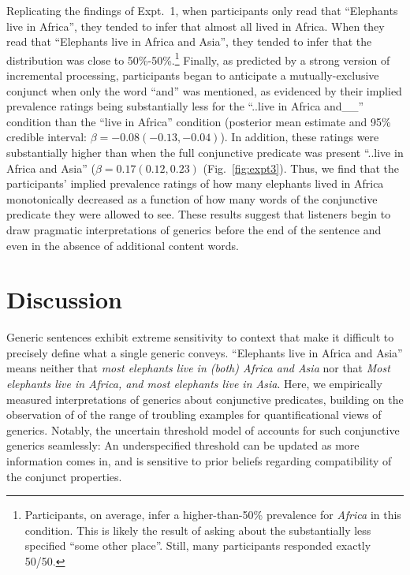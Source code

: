 \documentclass[10pt,letterpaper]{article}
\begin{document}
Replicating the findings of Expt.~1, when participants only read that ``Elephants live in Africa'', they tended to infer that almost all lived in Africa. 
When they read that ``Elephants live in Africa and Asia'', they tended to infer that the distribution was close to 50\%-50\%.\footnote{
Participants, on average, infer a higher-than-50\% prevalence for \emph{Africa} in this condition. 
This is likely the result of asking about the substantially less specified ``some other place''.  Still, many participants responded exactly 50/50.
}
Finally, as predicted by a strong version of incremental processing, participants began to anticipate a mutually-exclusive conjunct when only the word ``and'' was mentioned, as evidenced by their implied prevalence ratings being substantially less for the ``..live in Africa and\_\_'' condition than the ``live in Africa'' condition (posterior mean estimate and 95\% credible interval: $\beta = -0.08 (-0.13, -0.04)$).
In addition, these ratings were substantially higher than when the full conjunctive predicate was present ``..live in Africa and Asia'' ($\beta = 0.17 (0.12, 0.23)$  (Fig.~\ref{fig:expt3}).
Thus, we find that the participants' implied prevalence ratings of how many elephants lived in Africa monotonically decreased as a function of how many words of the conjunctive predicate they were allowed to see. 
These results suggest that listeners begin to draw pragmatic interpretations of generics before the end of the sentence and even in the absence of additional content words. 


\section{Discussion}

Generic sentences exhibit extreme sensitivity to context that make it difficult to precisely define what a single generic conveys. 
``Elephants live in Africa and Asia'' means neither that \emph{most elephants live in (both) Africa and Asia} nor that \emph{Most elephants live in Africa, and most elephants live in Asia}.
Here, we empirically measured interpretations of generics about conjunctive predicates, building on the observation of  of the range of troubling examples for quantificational views of generics.
Notably, the uncertain threshold model of  accounts for such conjunctive generics seamlessly: An underspecified threshold can be updated as more information comes in, and is sensitive to prior beliefs regarding compatibility of the conjunct properties.
\end{document}
